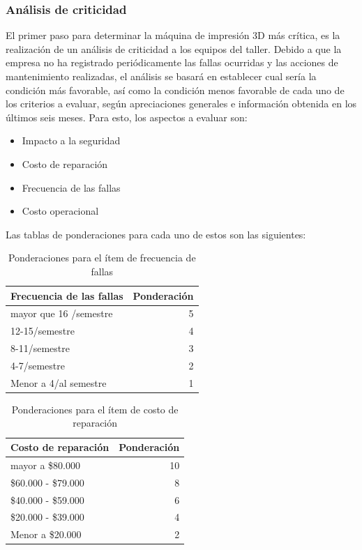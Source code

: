\subsubsection{Análisis de criticidad}

El primer paso para determinar la máquina de impresión 3D más crítica, es la realización de un análisis de criticidad a los equipos del taller. Debido a que la empresa no ha registrado periódicamente las fallas ocurridas y las acciones de mantenimiento realizadas, el análisis se basará en establecer cual sería la condición más favorable, así como la condición menos favorable de cada uno de los criterios a evaluar, según apreciaciones generales e información obtenida en los últimos seis meses. Para esto, los aspectos a evaluar son:

\begin{itemize}
\item Impacto a la seguridad
\item Costo de reparación
\item Frecuencia de las fallas
\item Costo operacional
\end{itemize}

Las tablas de ponderaciones para cada uno de estos son las siguientes:

\begin{table}[H]
  \centering
  
    \begin{tabular}{|l|r|}
    \hline
    Frecuencia de las fallas & \multicolumn{1}{l|}{Ponderación} \\
    \hline
    mayor que 16 /semestre & 5 \\
    \hline
    12-15/semestre & 4 \\
    \hline
    8-11/semestre & 3 \\
    \hline
    4-7/semestre & 2 \\
    \hline
    Menor a 4/al semestre & 1 \\
    \hline
    \end{tabular}%
    \caption{Ponderaciones para el ítem de frecuencia de fallas}
  \label{tab:addlabel}%
\end{table}%

\qquad\qquad%

\begin{table}[H]
  \centering
 
    \begin{tabular}{|l|r|}
    \hline
    Costo de reparación & \multicolumn{1}{l|}{Ponderación} \\
    \hline
    mayor a \$80.000 & 10 \\
    \hline
    \$60.000 - \$79.000 & 8 \\
    \hline
    \$40.000 - \$59.000 & 6 \\
    \hline
    \$20.000 - \$39.000 & 4 \\
    \hline
    Menor a \$20.000 & 2 \\
    \hline
    \end{tabular}%
    \caption{Ponderaciones para el ítem de costo de reparación}
  \label{tab:addlabel}%
\end{table}%

